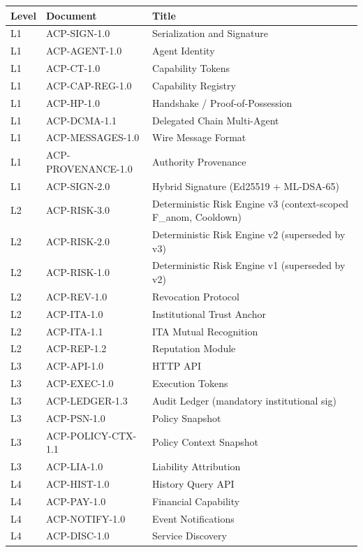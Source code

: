 \documentclass[11pt]{article}
\theoremstyle{definition}
\begin{document}
\begin{table}[h!]
\centering
\small
\begin{tabular}{@{}lll@{}}
\toprule
\textbf{Level} & \textbf{Document} & \textbf{Title} \\
\midrule
L1 & ACP-SIGN-1.0 & Serialization and Signature \\
L1 & ACP-AGENT-1.0 & Agent Identity \\
L1 & ACP-CT-1.0 & Capability Tokens \\
L1 & ACP-CAP-REG-1.0 & Capability Registry \\
L1 & ACP-HP-1.0 & Handshake / Proof-of-Possession \\
L1 & ACP-DCMA-1.1 & Delegated Chain Multi-Agent \\
L1 & ACP-MESSAGES-1.0 & Wire Message Format \\
L1 & ACP-PROVENANCE-1.0 & Authority Provenance \\
\midrule
L1 & ACP-SIGN-2.0 & Hybrid Signature (Ed25519 + ML-DSA-65) \\
\midrule
L2 & ACP-RISK-3.0 & Deterministic Risk Engine v3 (context-scoped F\_anom, Cooldown) \\
L2 & ACP-RISK-2.0 & Deterministic Risk Engine v2 (superseded by v3) \\
L2 & ACP-RISK-1.0 & Deterministic Risk Engine v1 (superseded by v2) \\
L2 & ACP-REV-1.0 & Revocation Protocol \\
L2 & ACP-ITA-1.0 & Institutional Trust Anchor \\
L2 & ACP-ITA-1.1 & ITA Mutual Recognition \\
L2 & ACP-REP-1.2 & Reputation Module \\
\midrule
L3 & ACP-API-1.0 & HTTP API \\
L3 & ACP-EXEC-1.0 & Execution Tokens \\
L3 & ACP-LEDGER-1.3 & Audit Ledger (mandatory institutional sig) \\
L3 & ACP-PSN-1.0 & Policy Snapshot \\
L3 & ACP-POLICY-CTX-1.1 & Policy Context Snapshot \\
L3 & ACP-LIA-1.0 & Liability Attribution \\
\midrule
L4 & ACP-HIST-1.0 & History Query API \\
L4 & ACP-PAY-1.0 & Financial Capability \\
L4 & ACP-NOTIFY-1.0 & Event Notifications \\
L4 & ACP-DISC-1.0 & Service Discovery \\

\end{tabular}
\end{table}
\end{document}
